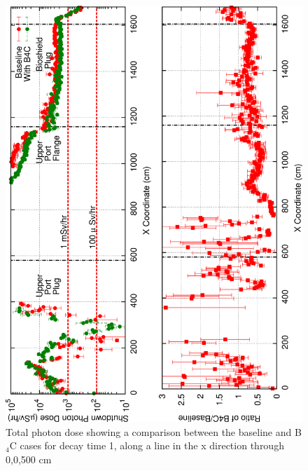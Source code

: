 \documentclass[12pt]{article}
\begin{document}
\begin{figure}[ht!]
\centering
\includegraphics[angle=-90,clip,scale=0.15]{../plots/photon_lineout/dc1_z500_lineout.png}
\caption{Total photon dose showing a comparison between the baseline and B$_4$C cases for decay time 1,
                 along a line in the x direction through 0,0,500 cm}
\label{fig:photons_dc1_total_dose_lineout_z500}
\end{figure}
\end{document}
